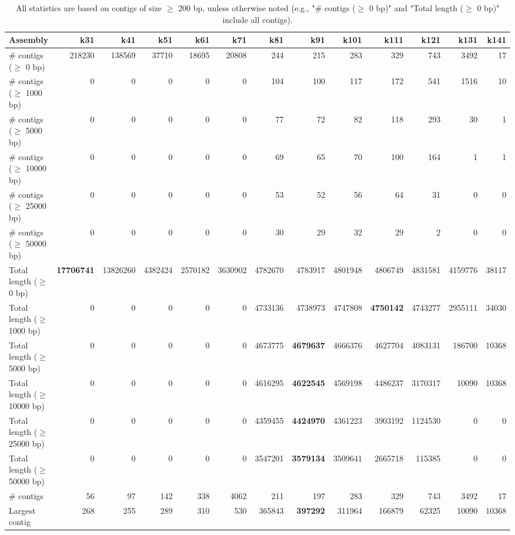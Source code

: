 \documentclass[12pt,a4paper]{article}
\begin{document}
\begin{table}[ht]
\begin{center}
\caption{All statistics are based on contigs of size $\geq$ 200 bp, unless otherwise noted (e.g., "\# contigs ($\geq$ 0 bp)" and "Total length ($\geq$ 0 bp)" include all contigs).}
\begin{tabular}{|l*{12}{|r}|}
\hline
Assembly & k31 & k41 & k51 & k61 & k71 & k81 & k91 & k101 & k111 & k121 & k131 & k141 \\ \hline
\# contigs ($\geq$ 0 bp) & 218230 & 138569 & 37710 & 18695 & 20808 & 244 & 215 & 283 & 329 & 743 & 3492 & 17 \\ \hline
\# contigs ($\geq$ 1000 bp) & 0 & 0 & 0 & 0 & 0 & 104 & 100 & 117 & 172 & 541 & 1516 & 10 \\ \hline
\# contigs ($\geq$ 5000 bp) & 0 & 0 & 0 & 0 & 0 & 77 & 72 & 82 & 118 & 293 & 30 & 1 \\ \hline
\# contigs ($\geq$ 10000 bp) & 0 & 0 & 0 & 0 & 0 & 69 & 65 & 70 & 100 & 164 & 1 & 1 \\ \hline
\# contigs ($\geq$ 25000 bp) & 0 & 0 & 0 & 0 & 0 & 53 & 52 & 56 & 64 & 31 & 0 & 0 \\ \hline
\# contigs ($\geq$ 50000 bp) & 0 & 0 & 0 & 0 & 0 & 30 & 29 & 32 & 29 & 2 & 0 & 0 \\ \hline
Total length ($\geq$ 0 bp) & {\bf 17706741} & 13826260 & 4382424 & 2570182 & 3630902 & 4782670 & 4783917 & 4801948 & 4806749 & 4831581 & 4159776 & 38117 \\ \hline
Total length ($\geq$ 1000 bp) & 0 & 0 & 0 & 0 & 0 & 4733136 & 4738973 & 4747808 & {\bf 4750142} & 4743277 & 2955111 & 34030 \\ \hline
Total length ($\geq$ 5000 bp) & 0 & 0 & 0 & 0 & 0 & 4673775 & {\bf 4679637} & 4666376 & 4627704 & 4083131 & 186700 & 10368 \\ \hline
Total length ($\geq$ 10000 bp) & 0 & 0 & 0 & 0 & 0 & 4616295 & {\bf 4622545} & 4569198 & 4486237 & 3170317 & 10090 & 10368 \\ \hline
Total length ($\geq$ 25000 bp) & 0 & 0 & 0 & 0 & 0 & 4359455 & {\bf 4424970} & 4361223 & 3903192 & 1124530 & 0 & 0 \\ \hline
Total length ($\geq$ 50000 bp) & 0 & 0 & 0 & 0 & 0 & 3547201 & {\bf 3579134} & 3509641 & 2665718 & 115385 & 0 & 0 \\ \hline
\# contigs & 56 & 97 & 142 & 338 & 4062 & 211 & 197 & 283 & 329 & 743 & 3492 & 17 \\ \hline
Largest contig & 268 & 255 & 289 & 310 & 530 & 365843 & {\bf 397292} & 311964 & 166879 & 62325 & 10090 & 10368 \\ \hline

\end{tabular}
\end{center}
\end{table}
\end{document}
